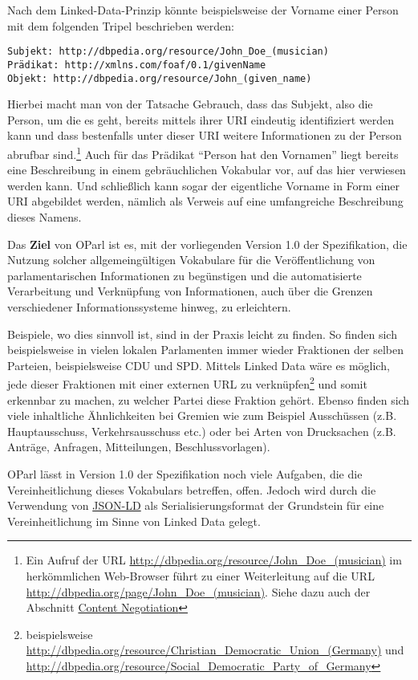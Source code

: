 \documentclass[,a4paper]{article}
\begin{document}
Nach dem Linked-Data-Prinzip könnte beispielsweise der Vorname einer
Person mit dem folgenden Tripel beschrieben werden:

\begin{verbatim}
Subjekt: http://dbpedia.org/resource/John_Doe_(musician)
Prädikat: http://xmlns.com/foaf/0.1/givenName
Objekt: http://dbpedia.org/resource/John_(given_name)
\end{verbatim}

Hierbei macht man von der Tatsache Gebrauch, dass das Subjekt, also die
Person, um die es geht, bereits mittels ihrer URI eindeutig
identifiziert werden kann und dass bestenfalls unter dieser URI weitere
Informationen zu der Person abrufbar sind.\footnote{Ein Aufruf der URL
  \url{http://dbpedia.org/resource/John_Doe_(musician)} im herkömmlichen
  Web-Browser führt zu einer Weiterleitung auf die URL
  \url{http://dbpedia.org/page/John_Doe_(musician)}. Siehe dazu auch der
  Abschnitt \hyperref[contentux5fnegotiation]{Content Negotiation}} Auch
für das Prädikat ``Person hat den Vornamen'' liegt bereits eine
Beschreibung in einem gebräuchlichen Vokabular vor, auf das hier
verwiesen werden kann. Und schließlich kann sogar der eigentliche
Vorname in Form einer URI abgebildet werden, nämlich als Verweis auf
eine umfangreiche Beschreibung dieses Namens.

Das \textbf{Ziel} von OParl ist es, mit der vorliegenden Version 1.0 der
Spezifikation, die Nutzung solcher allgemeingültigen Vokabulare für die
Veröffentlichung von parlamentarischen Informationen zu begünstigen und
die automatisierte Verarbeitung und Verknüpfung von Informationen, auch
über die Grenzen verschiedener Informationssysteme hinweg, zu
erleichtern.

Beispiele, wo dies sinnvoll ist, sind in der Praxis leicht zu finden. So
finden sich beispielsweise in vielen lokalen Parlamenten immer wieder
Fraktionen der selben Parteien, beispielsweise CDU und SPD. Mittels
Linked Data wäre es möglich, jede dieser Fraktionen mit einer externen
URL zu verknüpfen\footnote{beispielsweise
  \url{http://dbpedia.org/resource/Christian_Democratic_Union_(Germany)}
  und
  \url{http://dbpedia.org/resource/Social_Democratic_Party_of_Germany}}
und somit erkennbar zu machen, zu welcher Partei diese Fraktion gehört.
Ebenso finden sich viele inhaltliche Ähnlichkeiten bei Gremien wie zum
Beispiel Ausschüssen (z.B. Hauptausschuss, Verkehrsausschuss etc.) oder
bei Arten von Drucksachen (z.B. Anträge, Anfragen, Mitteilungen,
Beschlussvorlagen).

OParl lässt in Version 1.0 der Spezifikation noch viele Aufgaben, die
die Vereinheitlichung dieses Vokabulars betreffen, offen. Jedoch wird
durch die Verwendung von \hyperref[jsonld]{JSON-LD} als
Serialisierungsformat der Grundstein für eine Vereinheitlichung im Sinne
von Linked Data gelegt.
\end{document}
